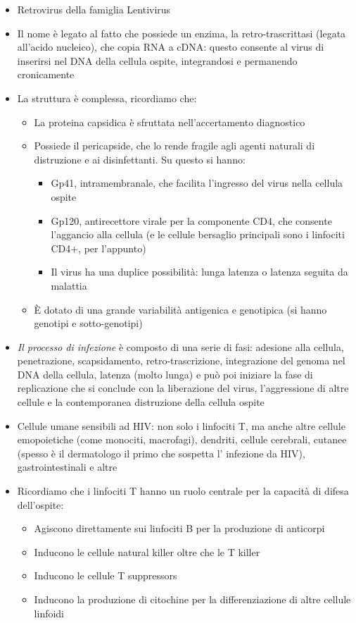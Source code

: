 \begin{itemize}
\item
  Retrovirus della famiglia Lentivirus
\item
  Il nome è legato al fatto che possiede un enzima, la
  retro-trascrittasi (legata all'acido nucleico), che copia RNA a cDNA:
  questo consente al virus di inserirsi nel DNA della cellula ospite,
  integrandosi e permanendo cronicamente
\item
  La struttura è complessa, ricordiamo che:
  \begin{itemize}
  \item
    La proteina capsidica è sfruttata nell'accertamento diagnostico
  \item
    Possiede il pericapside, che lo rende fragile agli agenti naturali
    di distruzione e ai disinfettanti. Su questo si hanno:

    \begin{itemize}
    \item
      Gp41, intramembranale, che facilita l'ingresso del virus nella
      cellula ospite
    \item
      Gp120, antirecettore virale per la componente CD4, che consente
      l'aggancio alla cellula (e le cellule bersaglio principali sono i
      linfociti CD4+, per l'appunto)
    \item
      Il virus ha una duplice possibilità: lunga latenza o latenza
      seguita da malattia
    \end{itemize}
  \item
    È dotato di una grande variabilità antigenica e genotipica (si hanno
    genotipi e sotto-genotipi)
  \end{itemize}
\item
  \emph{Il processo di infezione} è composto di una serie di fasi:
  adesione alla cellula, penetrazione, scapsidamento,
  retro-trascrizione, integrazione del genoma nel DNA della cellula,
  latenza (molto lunga) e può poi iniziare la fase di replicazione che
  si conclude con la liberazione del virus, l'aggressione di altre
  cellule e la contemporanea distruzione della cellula ospite
\item
  Cellule umane sensibili ad HIV: non solo i linfociti T, ma anche altre
  cellule emopoietiche (come monociti, macrofagi), dendriti, cellule
  cerebrali, cutanee (spesso è il dermatologo il primo che sospetta l'
  infezione da HIV), gastrointestinali e altre
\item
  Ricordiamo che i linfociti T hanno un ruolo centrale per la capacità
  di difesa dell'ospite:

  \begin{itemize}
  \item
    Agiscono direttamente sui linfociti B per la produzione di anticorpi
  \item
    Inducono le cellule natural killer oltre che le T killer
  \item
    Inducono le cellule T suppressors
  \item
    Inducono la produzione di citochine per la differenziazione di altre
    cellule linfoidi
  \end{itemize}
\end{itemize}

